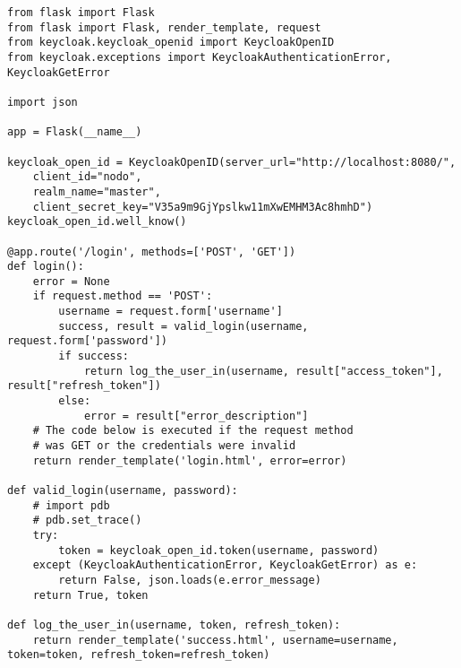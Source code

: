 \lstset{language=Python}
\lstset{frame=lines}
\lstset{basicstyle=\footnotesize}
\begin{lstlisting}
from flask import Flask
from flask import Flask, render_template, request
from keycloak.keycloak_openid import KeycloakOpenID
from keycloak.exceptions import KeycloakAuthenticationError, KeycloakGetError

import json

app = Flask(__name__)

keycloak_open_id = KeycloakOpenID(server_url="http://localhost:8080/", 
	client_id="nodo", 
	realm_name="master", 
	client_secret_key="V35a9m9GjYpslkw11mXwEMHM3Ac8hmhD")
keycloak_open_id.well_know()

@app.route('/login', methods=['POST', 'GET'])
def login():
	error = None
	if request.method == 'POST':
		username = request.form['username']
		success, result = valid_login(username, request.form['password'])
		if success:
			return log_the_user_in(username, result["access_token"], result["refresh_token"])
		else:
			error = result["error_description"]
	# The code below is executed if the request method
	# was GET or the credentials were invalid
	return render_template('login.html', error=error)

def valid_login(username, password):
	# import pdb
	# pdb.set_trace()
	try:
		token = keycloak_open_id.token(username, password)
	except (KeycloakAuthenticationError, KeycloakGetError) as e:
		return False, json.loads(e.error_message)
	return True, token

def log_the_user_in(username, token, refresh_token):
	return render_template('success.html', username=username, token=token, refresh_token=refresh_token)
\end{lstlisting}
